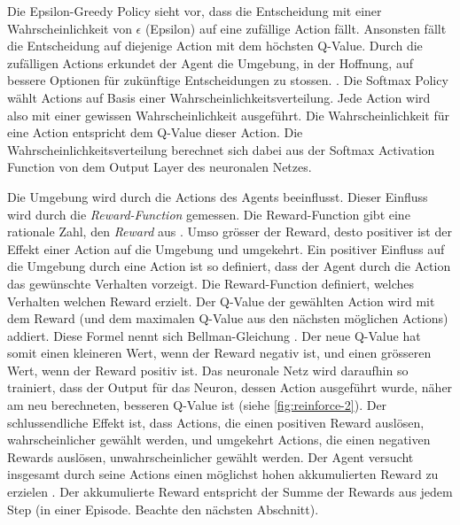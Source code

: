 Die Epsilon-Greedy Policy sieht vor, dass die Entscheidung mit einer
Wahrscheinlichkeit von $\epsilon$ (Epsilon) auf eine zufällige Action fällt.
Ansonsten fällt die Entscheidung auf diejenige Action mit dem höchsten Q-Value.
Durch die zufälligen Actions erkundet der Agent die Umgebung, in der Hoffnung,
auf bessere Optionen für zukünftige Entscheidungen zu stossen.
\cite{rajendra_koppula_exploration_nodate}. Die Softmax Policy wählt Actions auf
Basis einer Wahrscheinlichkeitsverteilung. Jede Action wird also mit einer
gewissen Wahrscheinlichkeit ausgeführt. Die Wahrscheinlichkeit für eine Action
entspricht dem Q-Value dieser Action. Die Wahrscheinlichkeitsverteilung
berechnet sich dabei aus der Softmax Activation Function von dem Output Layer
des neuronalen Netzes.

Die Umgebung wird durch die Actions des Agents beeinflusst. Dieser Einfluss wird
durch die \emph{Reward-Function} gemessen. Die Reward-Function gibt eine
rationale Zahl, den \emph{Reward} aus \cite[S. 75]{sutton_reinforcement_2014}.
Umso grösser der Reward, desto positiver ist der Effekt einer Action auf die
Umgebung und umgekehrt. Ein positiver Einfluss auf die Umgebung durch eine
Action ist so definiert, dass der Agent durch die Action das gewünschte
Verhalten vorzeigt. Die Reward-Function definiert, welches Verhalten welchen
Reward erzielt. Der Q-Value der gewählten Action wird mit dem Reward (und dem
maximalen Q-Value aus den nächsten möglichen Actions) addiert. Diese Formel
nennt sich Bellman-Gleichung \cite[S. 3]{mnih_playing_2013}. Der neue Q-Value
hat somit einen kleineren Wert, wenn der Reward negativ ist, und einen grösseren
Wert, wenn der Reward positiv ist. Das neuronale Netz wird daraufhin so
trainiert, dass der Output für das Neuron, dessen Action ausgeführt wurde, näher
am neu berechneten, besseren Q-Value ist (siehe \autoref{fig:reinforce-2}). Der
schlussendliche Effekt ist, dass Actions, die einen positiven Reward auslösen,
wahrscheinlicher gewählt werden, und umgekehrt Actions, die einen negativen
Rewards auslösen, unwahrscheinlicher gewählt werden. Der Agent versucht
insgesamt durch seine Actions einen möglichst hohen akkumulierten Reward zu
erzielen \cite[S. 57]{sutton_reinforcement_2014}. Der akkumulierte Reward
entspricht der Summe der Rewards aus jedem Step (in einer Episode. Beachte den
nächsten Abschnitt).
 
